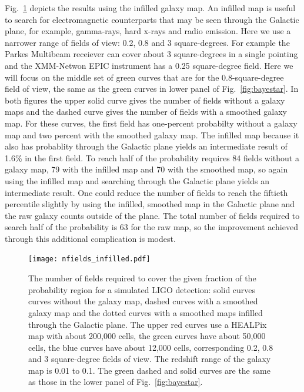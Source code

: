 \documentclass[useAMS,usenatbib]{mn2e}
\begin{document}
Fig.~\ref{fig:bayestar_inf} depicts the results using the infilled
galaxy map.  An infilled map is useful to search for electromagnetic
counterparts that may be seen through the Galactic plane, for example,
gamma-rays, hard x-rays and radio emission.  Here we use a narrower
range of fields of view: 0.2, 0.8 and 3 square-degrees.  For example
the Parkes Multibeam receiever \citep{1996PASA...13..243S} can cover
about 3 square-degrees in a single pointing and the XMM-Netwon EPIC
instrument has a 0.25 square-degree field.  Here we will focus on the
middle set of green curves that are for the 0.8-square-degree field of
view, the same as the green curves in lower panel of
Fig.~\ref{fig:bayestar}.  In both figures the upper solid curve gives
the number of fields without a galaxy maps and the dashed curve gives
the number of fields with a smoothed galaxy map.  For these curves,
the first field has one-percent probabilty without a galaxy map and
two percent with the smoothed galaxy map.  The infilled map because it
also has probablity through the Galactic plane yields an intermediate
result of 1.6\% in the first field. To reach half of the probability
requires 84 fields without a galaxy map, 79 with the infilled map and
70 with the smoothed map, so again using the infilled map and
searching through the Galactic plane yields an intermediate result.
One could reduce the number of fields to reach the fiftieth percentile
slightly by using the infilled, smoothed map in the Galactic plane and
the raw galaxy counts outside of the plane.  The total number of
fields required to search half of the probability is 63 for the raw
map, so the improvement achieved through this additional complication
is modest.
\begin{figure}
  \texttt{[image: nfields\_infilled.pdf]}
  \caption{The number of fields required to cover the given fraction
    of the probability region for a simulated LIGO detection: solid
    curves curves without the galaxy map, dashed curves with a
    smoothed galaxy map and the dotted curves with a smoothed maps
    infilled through the Galactic plane.  The upper red curves use a
    HEALPix map with about 200,000 cells, the green curves have about
    50,000 cells, the blue curves have about 12,000 cells,
    corresponding 0.2, 0.8 and 3 square-degree fields of view. The
    redshift range of the galaxy map is 0.01 to 0.1. The green dashed
    and solid curves are the same as those in the lower panel of
    Fig.~\ref{fig:bayestar}.}
  \label{fig:bayestar_inf}
\end{figure}
\end{document}
